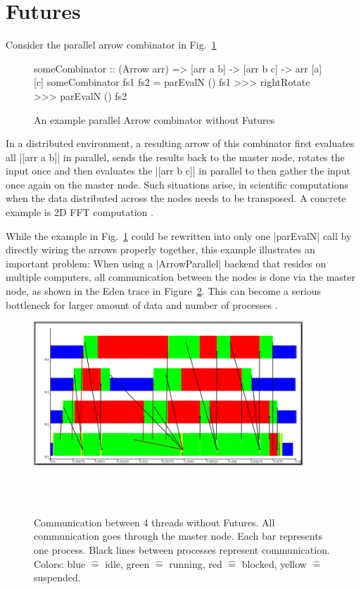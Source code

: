 \section{Futures} \label{futures}
Consider the parallel arrow combinator in Fig.~\ref{fig:someCombinator}
\begin{figure}[h]
\begin{code}
someCombinator :: (Arrow arr) => [arr a b] -> [arr b c] -> arr [a] [c]
someCombinator fs1 fs2 = parEvalN () fs1 >>> rightRotate >>> parEvalN () fs2
\end{code}
\caption{An example parallel Arrow combinator without Futures}
\label{fig:someCombinator}
\end{figure}
In a distributed environment, a resulting arrow of this combinator first evaluates all |[arr a b]| in parallel, sends the results back to the master node, rotates the input once and then evaluates the |[arr b c]| in parallel to then gather the input once again on the master node.
Such situations arise, \eg in scientific computations when the data distributed across the nodes needs to be transposed. A concrete example is 2D FFT computation \cite{Gorlatch,Berthold2009-fft}.

While the example in Fig.~\ref{fig:someCombinator} could be rewritten into only one |parEvalN| call by directly wiring the arrows properly together, this example illustrates an important problem: When using a |ArrowParallel| backend that resides on multiple computers, all communication between the nodes is done via the master node, as shown in the Eden trace in Figure~\ref{fig:withoutFutures}. This can become a serious bottleneck %
for larger amount of data and number of processes \citep[showcases][as, \eg]{Berthold2009-fft}.
\begin{figure}[ht]
	\centering
	\includegraphics[width=0.9\textwidth]{images/withoutFutures}
	\caption[without Futures]{Communication between 4 threads without Futures. All communication goes through the master node. Each bar represents one process. Black lines between processes represent communication. Colors: blue $\hat{=}$ idle, green $\hat{=}$ running, red  $\hat{=}$ blocked, yellow $\hat{=}$ suspended.}
	\label{fig:withoutFutures}
\\
\\
\end{figure}

